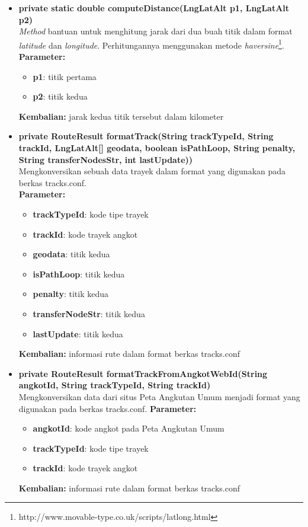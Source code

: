 \begin{itemize}
	\item \textbf{private static double computeDistance(LngLatAlt p1, LngLatAlt p2)} \\
		\textit{Method} bantuan untuk menghitung jarak dari dua buah titik dalam format \textit{latitude} dan \textit{longitude}. Perhitungannya menggunakan metode \textit{haversine}\footnote{http://www.movable-type.co.uk/scripts/latlong.html}. \\
		\textbf{Parameter:}
		\begin{itemize}
			\item \textbf{p1}: titik pertama
			\item \textbf{p2}: titik kedua
		\end{itemize}
		\textbf{Kembalian:} jarak kedua titik tersebut dalam kilometer
	\item \textbf{private RouteResult formatTrack(String trackTypeId, String trackId,
			LngLatAlt[] geodata, boolean isPathLoop, String penalty,
			String transferNodesStr, int lastUpdate))} \\
		Mengkonversikan sebuah data trayek dalam format yang digunakan pada berkas tracks.conf. \\
		\textbf{Parameter:}
		\begin{itemize}
			\item \textbf{trackTypeId}: kode tipe trayek
			\item \textbf{trackId}: kode trayek angkot
			\item \textbf{geodata}: titik kedua
			\item \textbf{isPathLoop}: titik kedua
			\item \textbf{penalty}: titik kedua
			\item \textbf{transferNodeStr}: titik kedua
			\item \textbf{lastUpdate}: titik kedua
		\end{itemize}
		\textbf{Kembalian:} informasi rute dalam format berkas tracks.conf
	\item \textbf{private RouteResult formatTrackFromAngkotWebId(String angkotId, String trackTypeId, String trackId)} \\
		Mengkonversikan data dari situs Peta Angkutan Umum menjadi format yang digunakan pada berkas tracks.conf.
		\textbf{Parameter:}
		\begin{itemize}
			\item \textbf{angkotId}: kode angkot pada Peta Angkutan Umum
			\item \textbf{trackTypeId}: kode tipe trayek
			\item \textbf{trackId}: kode trayek angkot
		\end{itemize}
		\textbf{Kembalian:} informasi rute dalam format berkas tracks.conf
\end{itemize}

